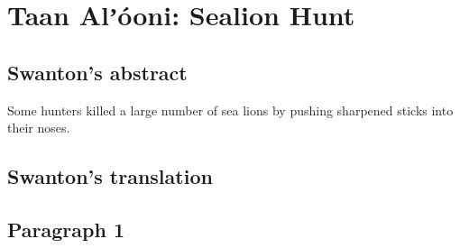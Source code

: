 
\resetexcnt
\chapter{Taan Alʼóoni: Sealion Hunt}\label{ch:102-sealion-hunt}

\section{Swanton’s abstract}\label{sec:102-swanton-abstract}

Some hunters killed a large number of sea lions by pushing sharpened sticks into their noses.

\section{Swanton’s translation}\label{sec:102-swanton-translation}

\section{Paragraph 1}\label{sec:102-para-1}


